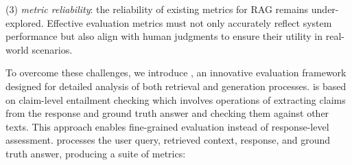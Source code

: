 (3) \emph{metric reliability}: 
the reliability of existing metrics for RAG remains under-explored. Effective evaluation metrics must not only accurately reflect system performance but also align with human judgments to ensure their utility in real-world scenarios.



To overcome these challenges, we introduce \benchname, an innovative evaluation framework designed for detailed analysis of both retrieval and generation processes. \benchname\space is based on claim-level entailment checking which involves operations of extracting claims from the response and ground truth answer and checking them against other texts. This approach enables fine-grained evaluation instead of response-level assessment. \benchname\space processes the user query, retrieved context, response, and ground truth answer, producing a suite of metrics:

